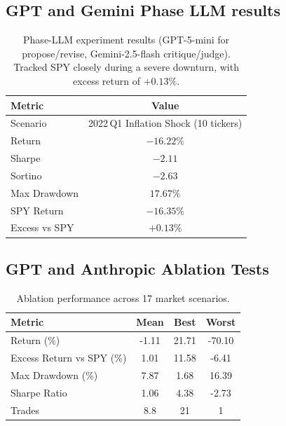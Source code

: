 \documentclass{article}
\begin{document}
\subsection{GPT and Gemini Phase LLM results}
\begin{table}[H]
\centering
\small
\begin{tabular}{@{}lc@{}}
\toprule
\textbf{Metric} & \textbf{Value} \\
\midrule
Scenario         & 2022\,Q1 Inflation Shock (10 tickers) \\
Return           & $-16.22\%$ \\
Sharpe           & $-2.11$ \\
Sortino          & $-2.63$ \\
Max Drawdown     & $17.67\%$ \\
SPY Return       & $-16.35\%$ \\
Excess vs SPY    & $+0.13\%$ \\
\bottomrule
\end{tabular}
\vspace{4pt}
\setlength{\belowcaptionskip}{-4pt}
\caption{Phase-LLM experiment results (GPT-5-mini for propose/revise, Gemini-2.5-flash critique/judge). Tracked SPY closely during a severe downturn, with excess return of $+0.13\%$.}
\label{tab:phase-llm}
\end{table}

\subsection{GPT and Anthropic Ablation Tests}
\label{app:ablation_performance}

\begin{table}[H]
\centering
\begin{tabular}{lccc}
\hline
\textbf{Metric} & \textbf{Mean} & \textbf{Best} & \textbf{Worst} \\
\hline
Return (\%) & -1.11 & 21.71 & -70.10 \\
Excess Return vs SPY (\%) & 1.01 & 11.58 & -6.41 \\
Max Drawdown (\%) & 7.87 & 1.68 & 16.39 \\
Sharpe Ratio & 1.06 & 4.38 & -2.73 \\
Trades & 8.8 & 21 & 1 \\
\hline
\end{tabular}
\vspace{4pt}
\caption{Ablation performance across 17 market scenarios.}
\label{tab:ablation_performance}
\end{table}
\end{document}
